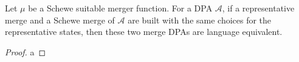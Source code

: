 \begin{theorem}
	Let $\mu$ be a Schewe suitable merger function. For a DPA $\mathcal{A}$, if a representative merge and a Schewe merge of $\mathcal{A}$ are built with the same choices for the representative states, then these two merge DPAs are language equivalent.
\end{theorem}

\begin{proof}
	a %
\end{proof}